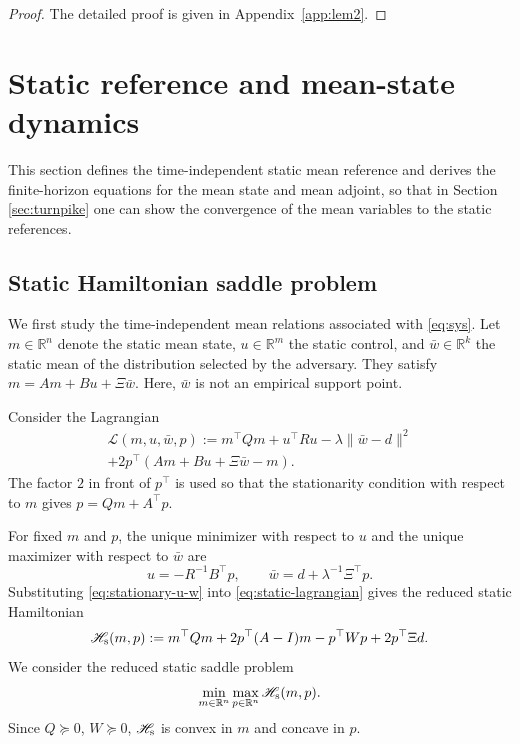 \documentclass[10pt,journal,twoside]{IEEEtran}
\theoremstyle{definition}
\theoremstyle{remark}
\begin{document}
\begin{proof}
	The detailed proof is given in
	Appendix~\ref{app:lem2}.
\end{proof}










\section{Static reference and mean-state dynamics}
\label{sec:static}



This section defines the time-independent static mean reference and derives the finite-horizon equations for the mean state and mean adjoint, so that in Section \ref{sec:turnpike} one can show the convergence of the mean variables to the static references.


\subsection{Static Hamiltonian saddle problem}
\label{subsec:static-kkt}

{We first study the time-independent mean relations associated with
\eqref{eq:sys}. Let \(m\in\mathbb R^n\) denote the static mean state,
\(u\in\mathbb R^m\) the static control, and
\(\bar w\in\mathbb R^k\) the static mean of the distribution selected by the
adversary. They satisfy
$m=Am+Bu+\Xi\bar w$.
Here, \(\bar w\) is  not an
empirical support point.}

{Consider the Lagrangian
\begin{multline}
	\mathscr L(m,u,\bar w,p)
	:=
	m^\top Qm+u^\top Ru-\lambda\|\bar w-d\|^2 \\
	+2p^\top(Am+Bu+\Xi\bar w-m).
	\label{eq:static-lagrangian}
\end{multline}
The factor \(2\) in front of \(p^\top\) is used so that the stationarity
condition with respect to \(m\) gives
\(p=Qm+A^\top p\).}

For fixed \(m\) and \(p\), the unique minimizer with respect to \(u\) and
the unique maximizer with respect to \(\bar w\) are
\begin{equation}
	u=-R^{-1}B^\top p,
	\qquad
	\bar w=d+\lambda^{-1}\Xi^\top p .
	\label{eq:stationary-u-w}
\end{equation}
Substituting \eqref{eq:stationary-u-w} into
\eqref{eq:static-lagrangian} gives the reduced static Hamiltonian
\begin{equation*}
	\begin{aligned}
		\mathscr H_{\rm s}(m,p)
		:={}
		m^\top Qm
		+2p^\top(A-I)m-p^\top Wp
		+2p^\top\Xi d .
	\end{aligned}
\end{equation*}
We consider the reduced static saddle problem
\begin{equation}
	\min_{m\in\mathbb R^n}
	\max_{p\in\mathbb R^n}
	\mathscr H_{\rm s}(m,p).
	\label{eq:static-minimax}
\end{equation}
Since \(Q\succeq0\), \(W\succeq0\),
\(\mathscr H_{\rm s}\) is convex in \(m\) and concave in \(p\).
\end{document}

